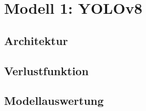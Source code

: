 \chapter{Modell 1: YOLOv8}\label{chap:yolov8}
\section{Architektur}



\section{Verlustfunktion}



\section{Modellauswertung}